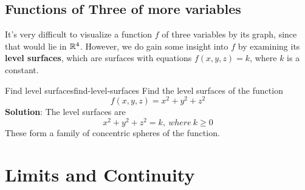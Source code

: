 \documentclass[math,code]{amznotes}
\theoremstyle{remark}
\begin{document}
\subsection{Functions of Three of more variables}
It's very difficult to visualize a function $f$ of three variables by its graph, since that would lie in $\mathbb{R}^4$. However, we do gain some insight into $f$ by examining its {\color{red} \textbf{level surfaces}}, which are surfaces with equations $f(x,y,z)=k$, where $k$ is a constant.
\begin{exbox}{Find level surfaces}{find-level-surfaces}
    Find the level surfaces of the function
    \begin{displaymath}
        f(x,y,z)=x^2+y^2+z^2
    \end{displaymath}
    {\color{blue} \textbf{Solution}}: The level surfaces are
    \begin{displaymath}
        x^2+y^2+z^2=k, ~where~ k\geq 0
    \end{displaymath}
    These form a family of concentric spheres of the function.
\end{exbox}

\section{Limits and Continuity}
\end{document}
